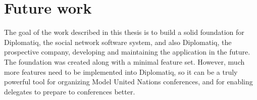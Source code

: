 \section{Future work}

The goal of the work described in this thesis is to build a solid foundation for Diplomatiq, the social network software system, and also Diplomatiq, the prospective company, developing and maintaining the application in the future. The foundation was created along with a minimal feature set. However, much more features need to be implemented into Diplomatiq, so it can be a truly powerful tool for organizing Model United Nations conferences, and for enabling delegates to prepare to conferences better.
